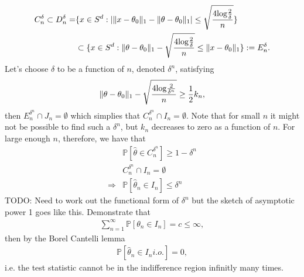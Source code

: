 \documentclass[11pt]{article}
\def\log{{\rm log}}
\begin{document}
\begin{align*}
  C_n^\delta \subset D_n^\delta =& \lbrace x \in S^d : |\|x-\theta_0\|_1 - \|\theta-\theta_0\|_1 | \leq \sqrt{\frac{4\log \frac{2}{\delta}}{n}}\rbrace\\
  &\subset \lbrace x \in S^d : \|\theta-\theta_0\|_1  - \sqrt{\frac{4\log \frac{2}{\delta}}{n}} \leq  \|x-\theta_0\|_1  \rbrace := E_n^{\delta}.
\end{align*}
Let's choose $\delta$ to be a function of $n$, denoted $\delta^n$, satisfying
\begin{align}
  \|\theta-\theta_0\|_1 - \sqrt{\frac{4\log \frac{2}{\delta^n}}{n}}\geq \frac{1}{2} k_n,
\end{align}
then $E_n^{\delta^n} \cap J_n = \emptyset$ which simplies that $C_n^{\delta^n} \cap I_n = \emptyset$. Note that for small $n$ it might not be possible to find such a $\delta^n$, but $k_n$ decreases to zero as a function of $n$. For large enough $n$, therefore, we have that
\begin{align*}
  &\mathbb{P}[\hat{\theta} \in C_n^{\delta^n}] \geq 1-\delta^n\\
  &C_n^{\delta^n} \cap I_n = \emptyset\\
  \Rightarrow &\mathbb{P}[\hat{\theta}_n \in I_n] \leq \delta^n
\end{align*}
TODO: Need to work out the functional form of $\delta^n$ but the sketch of asymptotic power 1 goes like this. Demonstrate that
\begin{align*}
  \sum_{n=1}^{\infty}\mathbb{P}[\theta_n \in I_n] = c \leq \infty,
\end{align*}
then by the Borel Cantelli lemma
\begin{align*}
  \mathbb{P}[\hat{\theta}_n \in I_n i.o.] = 0,
\end{align*}
i.e. the test statistic cannot be in the indifference region infinitly many times.
\end{document}
